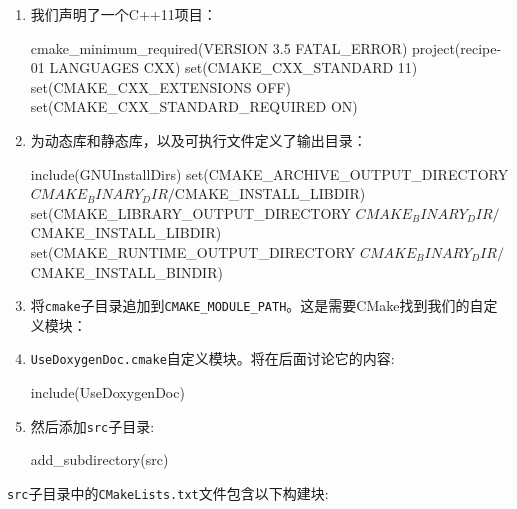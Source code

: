 \begin{enumerate}
\item 我们声明了一个C++11项目：

\begin{codebox}[cmake]
cmake_minimum_required(VERSION 3.5 FATAL_ERROR)
project(recipe-01 LANGUAGES CXX)
set(CMAKE_CXX_STANDARD 11)
set(CMAKE_CXX_EXTENSIONS OFF)
set(CMAKE_CXX_STANDARD_REQUIRED ON)
\end{codebox}

\item 为动态库和静态库，以及可执行文件定义了输出目录：

\begin{codebox}[cmake]
include(GNUInstallDirs)
set(CMAKE_ARCHIVE_OUTPUT_DIRECTORY
    ${CMAKE_BINARY_DIR}/${CMAKE_INSTALL_LIBDIR})
set(CMAKE_LIBRARY_OUTPUT_DIRECTORY
    ${CMAKE_BINARY_DIR}/${CMAKE_INSTALL_LIBDIR})
set(CMAKE_RUNTIME_OUTPUT_DIRECTORY
    ${CMAKE_BINARY_DIR}/${CMAKE_INSTALL_BINDIR})
\end{codebox}

\item 将\texttt{cmake}子目录追加到\texttt{CMAKE\_MODULE\_PATH}。这是需要CMake找到我们的自定义模块：


\item \texttt{UseDoxygenDoc.cmake}自定义模块。将在后面讨论它的内容:

\begin{codebox}[cmake]
include(UseDoxygenDoc)
\end{codebox}

\item 然后添加\texttt{src}子目录:

\begin{codebox}[cmake]
add_subdirectory(src)
\end{codebox}

\end{enumerate}

\texttt{src}子目录中的\texttt{CMakeLists.txt}文件包含以下构建块:

